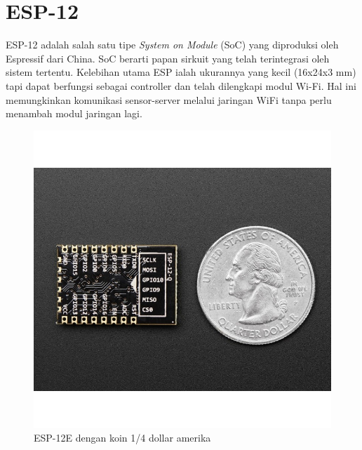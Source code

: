 \section{ESP-12}
ESP-12 adalah salah satu tipe \textit{System on Module} (SoC) yang diproduksi oleh Espressif dari China. SoC berarti papan sirkuit yang telah terintegrasi oleh sistem tertentu. Kelebihan utama ESP ialah ukurannya yang kecil (16x24x3 mm) tapi dapat berfungsi sebagai controller dan telah dilengkapi modul Wi-Fi. Hal ini memungkinkan komunikasi sensor-server melalui jaringan WiFi tanpa perlu menambah modul jaringan lagi.

\begin{figure}[H]
	\centering
	\includegraphics[scale=0.22]{images/esp12e.jpg}
	\caption{ESP-12E dengan koin 1/4 dollar amerika}
\end{figure}

